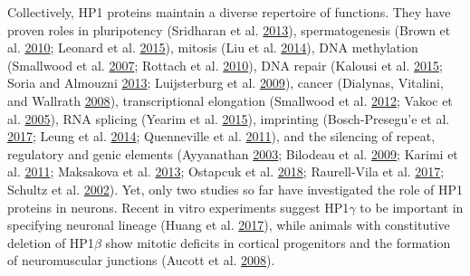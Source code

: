 \documentclass[onehalf,12pt]{beavtex}
\begin{document}
  Collectively, HP1 proteins maintain a diverse repertoire of functions.
  They have proven roles in pluripotency (Sridharan et al.
  \protect\hyperlink{ref-SridharanProteomicgenomicapproaches2013}{2013}),
  spermatogenesis (Brown et al.
  \protect\hyperlink{ref-BrownHP1gfunctionrequired2010}{2010}; Leonard et
  al. \protect\hyperlink{ref-LeonardAuroraAHP1gpathway2015}{2015}),
  mitosis (Liu et al.
  \protect\hyperlink{ref-LiuChromatinproteinHP12014}{2014}), DNA
  methylation (Smallwood et al.
  \protect\hyperlink{ref-SmallwoodFunctionalcooperationHP12007}{2007};
  Rottach et al.
  \protect\hyperlink{ref-RottachmultidomainproteinNp952010}{2010}), DNA
  repair (Kalousi et al.
  \protect\hyperlink{ref-KalousiNuclearOncogeneSET2015a}{2015}; Soria and
  Almouzni
  \protect\hyperlink{ref-SoriaDifferentialcontributionHP12013a}{2013};
  Luijsterburg et al.
  \protect\hyperlink{ref-LuijsterburgHeterochromatinproteinrecruited2009a}{2009}),
  cancer (Dialynas, Vitalini, and Wallrath
  \protect\hyperlink{ref-DialynasLinkingHeterochromatinProtein2008}{2008}),
  transcriptional elongation (Smallwood et al.
  \protect\hyperlink{ref-SmallwoodCBX3regulatesefficient2012}{2012}; Vakoc
  et al. \protect\hyperlink{ref-VakocHistoneH3Lysine2005}{2005}), RNA
  splicing (Yearim et al.
  \protect\hyperlink{ref-YearimHP1InvolvedRegulating2015}{2015}),
  imprinting (Bosch-Presegu\a'e et al.
  \protect\hyperlink{ref-Bosch-PresegueMammalianHP1Isoforms2017}{2017};
  Leung et al.
  \protect\hyperlink{ref-LeungRegulationDNAmethylation2014a}{2014};
  Quenneville et al.
  \protect\hyperlink{ref-Quennevilleembryonicstemcells2011}{2011}), and
  the silencing of repeat, regulatory and genic elements (Ayyanathan
  \protect\hyperlink{ref-AyyanathanRegulatedrecruitmentHP12003a}{2003};
  Bilodeau et al.
  \protect\hyperlink{ref-BilodeauSetDB1contributesrepression2009}{2009};
  Karimi et al.
  \protect\hyperlink{ref-KarimiDNAMethylationSETDB12011}{2011}; Maksakova
  et al. \protect\hyperlink{ref-MaksakovaDistinctrolesKAP12013}{2013};
  Ostapcuk et al.
  \protect\hyperlink{ref-OstapcukActivitydependentneuroprotectiveprotein2018}{2018};
  Raurell-Vila et al.
  \protect\hyperlink{ref-Raurell-VilaHP1isoformspecificfeedback2017}{2017};
  Schultz et al.
  \protect\hyperlink{ref-SchultzSETDB1novelKAP1associated2002a}{2002}).
  Yet, only two studies so far have investigated the role of HP1 proteins
  in neurons. Recent in vitro experiments suggest HP1\(\gamma\) to be
  important in specifying neuronal lineage (Huang et al.
  \protect\hyperlink{ref-HuangCbx3maintainslineage2017}{2017}), while
  animals with constitutive deletion of HP1\(\beta\) show mitotic deficits
  in cortical progenitors and the formation of neuromuscular junctions
  (Aucott et al.
  \protect\hyperlink{ref-AucottHP1requireddevelopment2008}{2008}).
  
\end{document}

